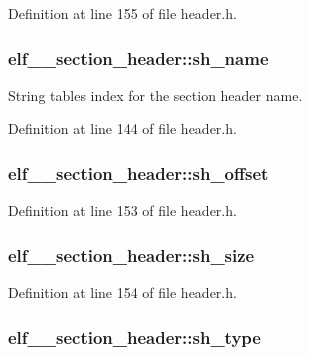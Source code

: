Definition at line 155 of file header.h.

\hypertarget{structelf__32__section__header_a92c7b4858577346a54631f8a41cf6320}{
\subsubsection[{sh\_\-name}]{ {\bf elf\_\_\-section\_\-header::sh\_\-name}}}
\label{structelf__32__section__header_a92c7b4858577346a54631f8a41cf6320}


String tables index for the section header name. 



Definition at line 144 of file header.h.

\hypertarget{structelf__32__section__header_a5f1a922a39c88958afb39326f293389c}{
\subsubsection[{sh\_\-offset}]{ {\bf elf\_\_\-section\_\-header::sh\_\-offset}}}
\label{structelf__32__section__header_a5f1a922a39c88958afb39326f293389c}


Definition at line 153 of file header.h.

\hypertarget{structelf__32__section__header_ae0bb6c0f10c7b5e9242b89f8f02a5acb}{
\subsubsection[{sh\_\-size}]{ {\bf elf\_\_\-section\_\-header::sh\_\-size}}}
\label{structelf__32__section__header_ae0bb6c0f10c7b5e9242b89f8f02a5acb}


Definition at line 154 of file header.h.

\hypertarget{structelf__32__section__header_aa19ec0f26eb1c4e79de6f1b7e7362d7c}{
\subsubsection[{sh\_\-type}]{ {\bf elf\_\_\-section\_\-header::sh\_\-type}}}
\label{structelf__32__section__header_aa19ec0f26eb1c4e79de6f1b7e7362d7c}


